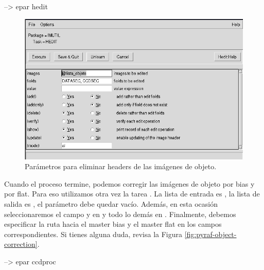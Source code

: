 \begin{shell}
--> epar hedit
\end{shell}

\begin{figure}[htb]
  \centering
	\includegraphics[width=\textwidth]{figures/pyraf-hedit-objeto.png}
	\caption{Parámetros para eliminar headers de las imágenes de objeto.}
	\label{fig:pyraf-hedit-objeto} 
\end{figure}

Cuando el proceso termine, podemos corregir las imágenes de objeto por bias y por flat. Para eso utilizamos otra vez la tarea . La lista de entrada es , la lista de salida es , el parámetro  debe quedar vacío. Además, en esta ocasión seleccionaremos el campo  y  en  y todo lo demás en . Finalmente, debemos especificar la ruta hacia el master bias y el master flat en los campos correspondientes. Si tienes alguna duda, revisa la Figura \ref{fig:pyraf-object-correction}.

\begin{shell}
--> epar ccdproc
\end{shell} 

